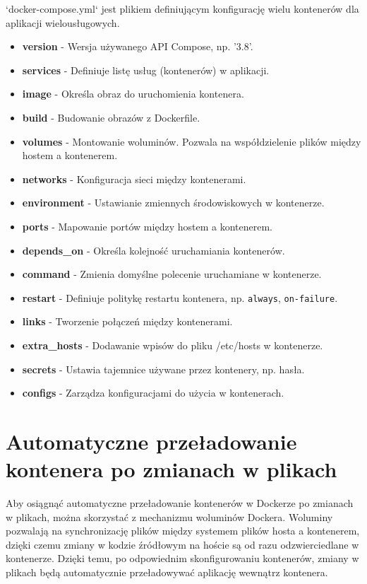\documentclass[a4paper,12pt]{article}
\begin{document}
`docker-compose.yml` jest plikiem definiującym konfigurację wielu kontenerów dla aplikacji wielousługowych.

\begin{itemize}
    \item \textbf{version} - Wersja używanego API Compose, np. '3.8'.
    \item \textbf{services} - Definiuje listę usług (kontenerów) w aplikacji.
    \item \textbf{image} - Określa obraz do uruchomienia kontenera.
    \item \textbf{build} - Budowanie obrazów z Dockerfile.
    \item \textbf{volumes} - Montowanie woluminów. Pozwala na współdzielenie plików między hostem a kontenerem.
    \item \textbf{networks} - Konfiguracja sieci między kontenerami.
    \item \textbf{environment} - Ustawianie zmiennych środowiskowych w kontenerze.
    \item \textbf{ports} - Mapowanie portów między hostem a kontenerem.
    \item \textbf{depends\_on} - Określa kolejność uruchamiania kontenerów.
    \item \textbf{command} - Zmienia domyślne polecenie uruchamiane w kontenerze.
    \item \textbf{restart} - Definiuje politykę restartu kontenera, np. \texttt{always}, \texttt{on-failure}.
    \item \textbf{links} - Tworzenie połączeń między kontenerami.
    \item \textbf{extra\_hosts} - Dodawanie wpisów do pliku /etc/hosts w kontenerze.
    \item \textbf{secrets} - Ustawia tajemnice używane przez kontenery, np. hasła.
    \item \textbf{configs} - Zarządza konfiguracjami do użycia w kontenerach.
\end{itemize}

\section{Automatyczne przeładowanie kontenera po zmianach w plikach}

Aby osiągnąć automatyczne przeładowanie kontenerów w Dockerze po zmianach w plikach, można skorzystać z mechanizmu woluminów Dockera. Woluminy pozwalają na synchronizację plików między systemem plików hosta a kontenerem, dzięki czemu zmiany w kodzie źródłowym na hoście są od razu odzwierciedlane w kontenerze. Dzięki temu, po odpowiednim skonfigurowaniu kontenerów, zmiany w plikach będą automatycznie przeładowywać aplikację wewnątrz kontenera.
\end{document}

